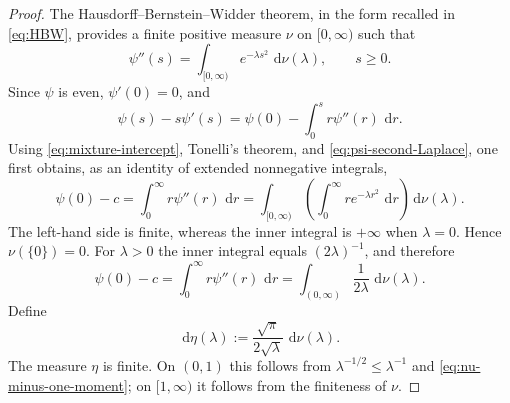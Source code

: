 \documentclass[11pt]{article}
\theoremstyle{definition}
\theoremstyle{remark}
\newcommand{\dd}{\,\mathrm d}
\begin{document}
\begin{proof}
The Hausdorff--Bernstein--Widder theorem, in the form
recalled in \eqref{eq:HBW}, provides a finite positive measure $\nu$
on $[0,\infty)$ such that
\begin{equation}\label{eq:psi-second-Laplace}
 \psi''(s)=\int_{[0,\infty)}e^{-\lambda s^2}
 \,\dd\nu(\lambda),
 \qquad s\geq0.
\end{equation}
Since $\psi$ is even, $\psi'(0)=0$, and
\[
 \psi(s)-s\psi'(s)
 =\psi(0)-\int_0^s r\psi''(r)\,\dd r.
\]
Using \eqref{eq:mixture-intercept}, Tonelli's theorem, and
\eqref{eq:psi-second-Laplace}, one first obtains, as an identity of
extended nonnegative integrals,
\[
 \psi(0)-c
 =\int_0^\infty r\psi''(r)\,\dd r
 =\int_{[0,\infty)}
   \left(\int_0^\infty r e^{-\lambda r^2}\,\dd r\right)
   \dd\nu(\lambda).
\]
The left-hand side is finite, whereas the inner integral is
$+\infty$ when $\lambda=0$.  Hence $\nu(\{0\})=0$.  For
$\lambda>0$ the inner integral equals $(2\lambda)^{-1}$, and therefore
\begin{equation}\label{eq:nu-minus-one-moment}
 \psi(0)-c
 =\int_0^\infty r\psi''(r)\,\dd r
 =\int_{(0,\infty)}\frac1{2\lambda}\,\dd\nu(\lambda).
\end{equation}
Define
\begin{equation}\label{eq:eta-definition}
 \dd\eta(\lambda):=
 \frac{\sqrt\pi}{2\sqrt\lambda}\,\dd\nu(\lambda).
\end{equation}
The measure $\eta$ is finite.  On $(0,1)$ this follows from
$\lambda^{-1/2}\leq\lambda^{-1}$ and
\eqref{eq:nu-minus-one-moment}; on $[1,\infty)$ it follows from the
finiteness of $\nu$.


\end{proof}
\end{document}
